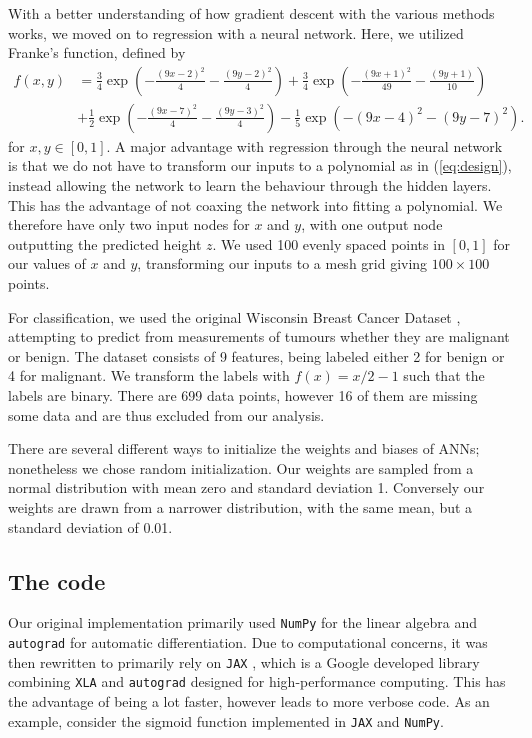 \documentclass{article}
\theoremstyle{definition}
\begin{document}
With a better understanding of how gradient descent with the various methods works, we moved on to regression with a neural network. Here, we utilized Franke's function, defined by
\begin{equation*}
    \begin{split}
        f(x,y) & = \frac{3}{4}\exp\left(-\frac{(9x-2)^2}{4} - \frac{(9y-2)^2}{4}\right) + \frac{3}{4}\exp\left(-\frac{(9x+1)^2}{49} - \frac{(9y+1)}{10}\right) \\
        & + \frac{1}{2}\exp\left(-\frac{(9x-7)^2}{4} - \frac{(9y-3)^2}{4}\right) - \frac{1}{5}\exp\left(-(9x-4)^2 - (9y-7)^2\right).
    \end{split}
\end{equation*}
for $x,y \in [0,1]$. A major advantage with regression through the neural network is that we do not have to transform our inputs to a polynomial as in (\ref{eq:design}), instead allowing the network to learn the behaviour through the hidden layers. This has the advantage of not coaxing the network into fitting a polynomial. We therefore have only two input nodes for $x$ and $y$, with one output node outputting the predicted height $z$. We used 100 evenly spaced points in $[0,1]$ for our values of $x$ and $y$, transforming our inputs to a mesh grid giving $100 \times 100$ points.

For classification, we used the original Wisconsin Breast Cancer Dataset \parencite{breastcancerwisonsin}, attempting to predict from measurements of tumours whether they are malignant or benign. The dataset consists of 9 features, being labeled either 2 for benign or 4 for malignant. We transform the labels with $f(x) = x / 2 - 1$ such that the labels are binary. There are 699 data points, however 16 of them are missing some data and are thus excluded from our analysis.

There are several different ways to initialize the weights and biases of ANNs; nonetheless we chose random initialization. Our weights are sampled from a normal distribution with mean zero and standard deviation 1. Conversely our weights are drawn from a narrower distribution, with the same mean, but a standard deviation of 0.01.

\subsection{The code}
Our original implementation primarily used \verb|NumPy| for the linear algebra and \verb|autograd| for automatic differentiation. Due to computational concerns, it was then rewritten to primarily rely on \verb|JAX| \parencite{jax2018github}, which is a Google developed library combining \verb|XLA| and \verb|autograd| designed for high-performance computing. This has the advantage of being a lot faster, however leads to more verbose code. As an example, consider the sigmoid function implemented in \verb|JAX| and \verb|NumPy|.
\end{document}
